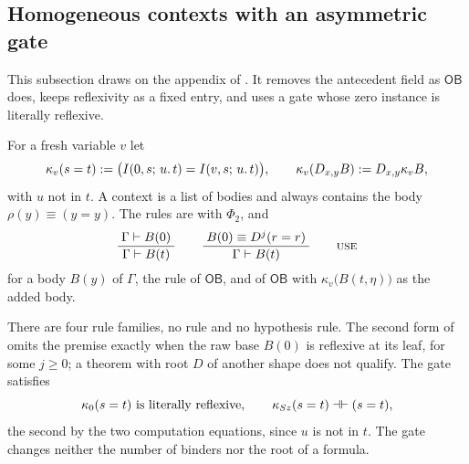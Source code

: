 \subsection{Homogeneous contexts with an asymmetric gate}
\label{claus:sec:homog}

This subsection draws on the appendix of . It removes
the antecedent field as $\mathsf{OB}$ does, keeps reflexivity as a fixed
entry, and uses a gate whose zero instance is literally reflexive.

\begin{definition}
\label{claus:def:hb}
For a fresh variable $v$ let
\[
 \kappa_v(s=t)\mathrel{:=}\bigl(I(0,s;\,u.\,t)=I(v,s;\,u.\,t)\bigr),
 \qquad
 \kappa_v(D_{x,y}B)\mathrel{:=}D_{x,y}\kappa_vB,
\]
with $u$ not in $t$. A context is a list of bodies and always contains
the body $\rho(y)\equiv(y=y)$. The rules are  with $\Phi_2$,
and
\[
 \infrule{\Gamma\proves B(0)}{\Gamma\proves B(t)}
 \qquad
 \infrule{B(0)\equiv D^j(r=r)}{\Gamma\proves B(t)}
 \qquad\rulename{Use}
\]
for a body $B(y)$ of $\Gamma$, the rule  of $\mathsf{OB}$,
and  of $\mathsf{OB}$ with
$\kappa_v\bigl(B(t,\eta)\bigr)$ as the added body.
\end{definition}

There are four rule families, no rule  and no hypothesis
rule. The second form of  omits the premise exactly when the
raw base $B(0)$ is reflexive at its leaf, for some $j\ge 0$; a theorem
with root $D$ of another shape does not qualify. The gate satisfies
\[
 \kappa_0(s=t)\ \text{is literally reflexive},\qquad
 \kappa_{S z}(s=t)\dashv\vdash(s=t),
\]
the second by the two computation equations, since $u$ is not in $t$. The
gate changes neither the number of binders nor the root of a formula.

